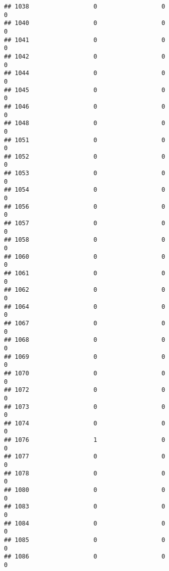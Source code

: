 \documentclass[
]{article}
\begin{document}
\begin{verbatim}
## 1038                  0                  0                              0
## 1040                  0                  0                              0
## 1041                  0                  0                              0
## 1042                  0                  0                              0
## 1044                  0                  0                              0
## 1045                  0                  0                              0
## 1046                  0                  0                              0
## 1048                  0                  0                              0
## 1051                  0                  0                              0
## 1052                  0                  0                              0
## 1053                  0                  0                              0
## 1054                  0                  0                              0
## 1056                  0                  0                              0
## 1057                  0                  0                              0
## 1058                  0                  0                              0
## 1060                  0                  0                              0
## 1061                  0                  0                              0
## 1062                  0                  0                              0
## 1064                  0                  0                              0
## 1067                  0                  0                              0
## 1068                  0                  0                              0
## 1069                  0                  0                              0
## 1070                  0                  0                              0
## 1072                  0                  0                              0
## 1073                  0                  0                              0
## 1074                  0                  0                              0
## 1076                  1                  0                              0
## 1077                  0                  0                              0
## 1078                  0                  0                              0
## 1080                  0                  0                              0
## 1083                  0                  0                              0
## 1084                  0                  0                              0
## 1085                  0                  0                              0
## 1086                  0                  0                              0

\end{verbatim}
\end{document}
